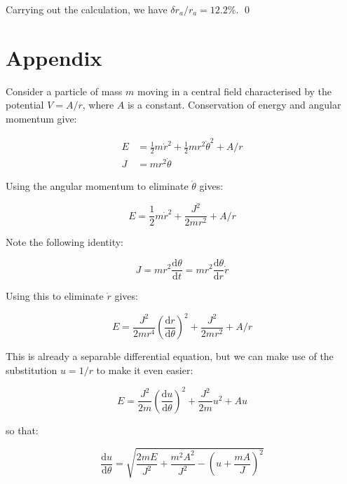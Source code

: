 \documentclass[12pt]{article}
\begin{document}
Carrying out the calculation, we have $\delta r_{a}/r_{a} = 12.2\%$.
\qed


\appendix
\pagebreak
\section*{Appendix}


Consider a particle of mass $m$ moving in a central field characterised by the potential $V = A/r$, where $A$ is a constant. Conservation of energy and angular momentum give:

\begin{equation}
\begin{split}
    E &= \frac{1}{2} m \dot{r}^{2} + \frac{1}{2} m r^{2} \dot{\theta}^{2} + A/r \\
    J &= m r^{2} \dot{\theta}
\end{split}
\end{equation}

Using the angular momentum to eliminate $\dot{\theta}$ gives:

\begin{equation}
    E = \frac{1}{2} m \dot{r}^{2} + \frac{J^{2}}{2m r^{2}} + A/r
\end{equation}

Note the following identity:

\begin{equation}
    J = m r^{2} \frac{\mathrm{d}\theta}{\mathrm{d}t} = m r^{2} \frac{\mathrm{d}\theta}{\mathrm{d}r} \dot{r}
\end{equation}

Using this to eliminate $\dot{r}$ gives:

\begin{equation}
    E = \frac{J^{2}}{2mr^{4}} \left( \frac{\mathrm{d}r}{\mathrm{d}\theta} \right)^{2} + \frac{J^{2}}{2m r^{2}} + A/r
\end{equation}

This is already a separable differential equation, but we can make use of the substitution $u = 1/r$ to make it even easier:

\begin{equation}
    E = \frac{J^{2}}{2m} \left( \frac{\mathrm{d}u}{\mathrm{d}\theta} \right)^{2} + \frac{J^{2}}{2m} u^{2} + A u
\end{equation}

so that:

\begin{equation}
    \frac{\mathrm{d}u}{\mathrm{d}\theta} = \sqrt{\frac{2mE}{J^{2}} + \frac{m^{2}A^{2}}{J^{2}} - \left( u + \frac{mA}{J} \right)^{2}}
\end{equation}
\end{document}
